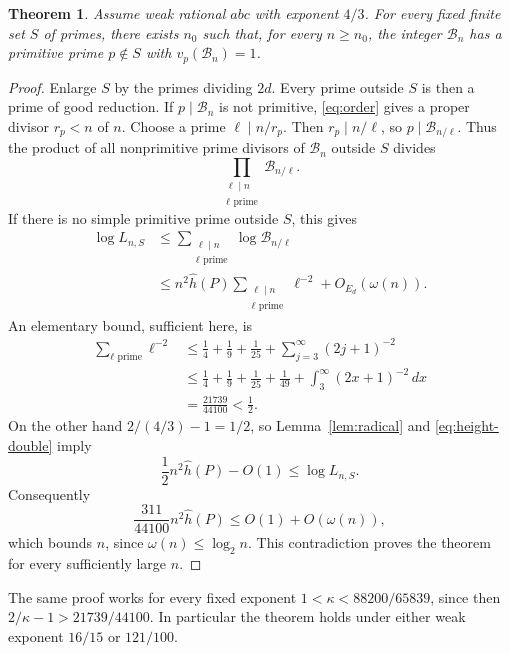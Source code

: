 \documentclass[11pt,a4paper]{article}
\newtheorem{theorem}{Theorem}[section]
\begin{document}
\begin{theorem}\label{thm:primitive}
Assume weak rational $abc$ with exponent $4/3$.
For every fixed finite set $S$ of primes, there exists $n_0$ such
that, for every $n\ge n_0$, the integer $\mathcal B_n$ has a primitive prime
$p\notin S$ with $v_p(\mathcal B_n)=1$.
\end{theorem}
\begin{proof}
Enlarge $S$ by the primes dividing $2d$. Every prime outside $S$
is then a prime of good reduction. If $p\mid \mathcal B_n$ is not primitive,
\eqref{eq:order} gives a proper divisor $r_p<n$ of $n$. Choose a
prime $\ell\mid n/r_p$. Then $r_p\mid n/\ell$, so
$p\mid \mathcal B_{n/\ell}$. Thus the product of all nonprimitive prime
divisors of $\mathcal B_n$ outside $S$ divides
\[
 \prod_{\substack{\ell\mid n\\\ell\text{ prime}}}\mathcal B_{n/\ell}.
\]
If there is no simple primitive prime outside $S$, this gives
\begin{align*}
 \log L_{n,S}
 &\le\sum_{\substack{\ell\mid n\\\ell\text{ prime}}}
                                     \log\mathcal B_{n/\ell}\\
 &\le n^2\widehat h(P)
       \sum_{\substack{\ell\mid n\\\ell\text{ prime}}}\ell^{-2}
                                                     +O_{E_d}(\omega(n)).
\end{align*}
An elementary bound, sufficient here, is
\begin{align*}
 \sum_{\ell\text{ prime}}\ell^{-2}
 &\le\frac14+\frac19+\frac1{25}
                    +\sum_{j=3}^{\infty}(2j+1)^{-2}\\
 &\le\frac14+\frac19+\frac1{25}+\frac1{49}
                         +\int_3^{\infty}(2x+1)^{-2}\,dx\\
 &=\frac{21739}{44100}<\frac12.
\end{align*}
On the other hand $2/(4/3)-1=1/2$, so
Lemma~\ref{lem:radical} and \eqref{eq:height-double} imply
\[
 \frac12 n^2\widehat h(P)-O(1)\le\log L_{n,S}.
\]
Consequently
\[
                    \frac{311}{44100}n^2\widehat h(P)
                                       \le O(1)+O(\omega(n)),
\]
which bounds $n$, since $\omega(n)\le\log_2 n$.
This contradiction proves the theorem for every sufficiently large $n$.
\end{proof}

The same proof works for every fixed exponent
$1<\kappa<88200/65839$, since then
$2/\kappa-1>21739/44100$. In particular the theorem holds under
either weak exponent $16/15$ or $121/100$.
\end{document}
